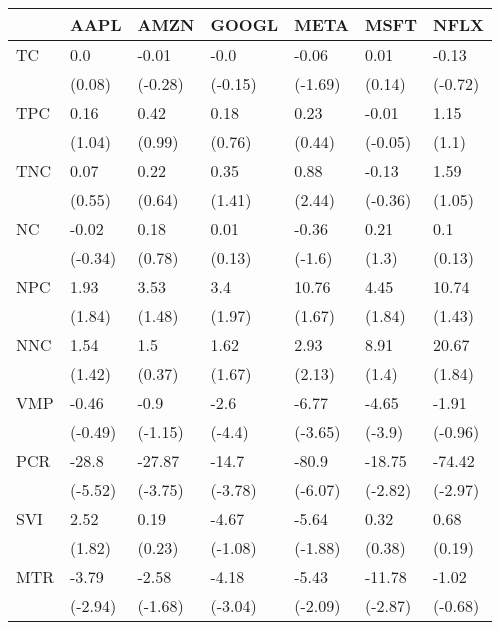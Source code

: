 \begin{tabular}{lllllll}
\toprule
{} &     AAPL &     AMZN &    GOOGL &     META &     MSFT &     NFLX \\
\midrule
TC  &      0.0 &    -0.01 &     -0.0 &    -0.06 &     0.01 &    -0.13 \\
    &   (0.08) &  (-0.28) &  (-0.15) &  (-1.69) &   (0.14) &  (-0.72) \\
TPC &     0.16 &     0.42 &     0.18 &     0.23 &    -0.01 &     1.15 \\
    &   (1.04) &   (0.99) &   (0.76) &   (0.44) &  (-0.05) &    (1.1) \\
TNC &     0.07 &     0.22 &     0.35 &     0.88 &    -0.13 &     1.59 \\
    &   (0.55) &   (0.64) &   (1.41) &   (2.44) &  (-0.36) &   (1.05) \\
NC  &    -0.02 &     0.18 &     0.01 &    -0.36 &     0.21 &      0.1 \\
    &  (-0.34) &   (0.78) &   (0.13) &   (-1.6) &    (1.3) &   (0.13) \\
NPC &     1.93 &     3.53 &      3.4 &    10.76 &     4.45 &    10.74 \\
    &   (1.84) &   (1.48) &   (1.97) &   (1.67) &   (1.84) &   (1.43) \\
NNC &     1.54 &      1.5 &     1.62 &     2.93 &     8.91 &    20.67 \\
    &   (1.42) &   (0.37) &   (1.67) &   (2.13) &    (1.4) &   (1.84) \\
VMP &    -0.46 &     -0.9 &     -2.6 &    -6.77 &    -4.65 &    -1.91 \\
    &  (-0.49) &  (-1.15) &   (-4.4) &  (-3.65) &   (-3.9) &  (-0.96) \\
PCR &    -28.8 &   -27.87 &    -14.7 &    -80.9 &   -18.75 &   -74.42 \\
    &  (-5.52) &  (-3.75) &  (-3.78) &  (-6.07) &  (-2.82) &  (-2.97) \\
SVI &     2.52 &     0.19 &    -4.67 &    -5.64 &     0.32 &     0.68 \\
    &   (1.82) &   (0.23) &  (-1.08) &  (-1.88) &   (0.38) &   (0.19) \\
MTR &    -3.79 &    -2.58 &    -4.18 &    -5.43 &   -11.78 &    -1.02 \\
    &  (-2.94) &  (-1.68) &  (-3.04) &  (-2.09) &  (-2.87) &  (-0.68) \\
\bottomrule
\end{tabular}
